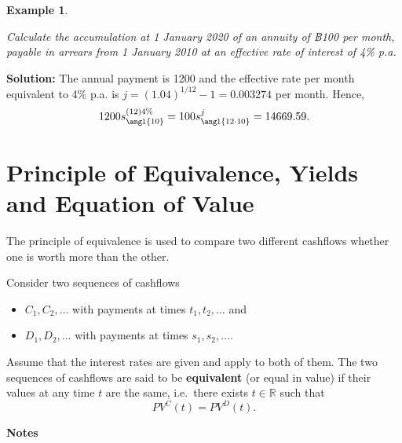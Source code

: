 \documentclass[landscape, 20pt]{extreport}
\theoremstyle{definition}
\theoremstyle{definition}
\newtheorem{example}{Example}[chapter]
\theoremstyle{definition}
\theoremstyle{definition}
\theoremstyle{remark}
\begin{document}
\newpage \begin{example}
\protect\hypertarget{exm:unlabeled-div-37}{}\label{exm:unlabeled-div-37}

\emph{Calculate the accumulation at 1 January 2020 of an annuity of ฿100 per
month, payable in arrears from 1 January 2010 at an effective rate of
interest of 4\% p.a.}

\end{example}

\textbf{Solution:} The annual payment is 1200 and the effective rate per
month equivalent to 4\% p.a. is \(j = (1.04)^{1/12} - 1 = 0.003274\) per
month. Hence,
\[1200 s^{(12)4\%}_\angl{10}   = 100  s^j_\angl{12\cdot 10} = 14669.59.\]



\newpage \hypertarget{principle-of-equivalence-yields-and-equation-of-value}{%
\section{Principle of Equivalence, Yields and Equation of Value}\label{principle-of-equivalence-yields-and-equation-of-value}}

The principle of equivalence is used to compare two different cashflows
whether one is worth more than the other.

Consider two sequences of cashflows

\begin{itemize}
\item
  \(C_1, C_2, \ldots\) with payments at times \(t_1, t_2, \ldots\) and
\item
  \(D_1, D_2, \ldots\) with payments at times \(s_1, s_2, \ldots\).
\end{itemize}

Assume that the interest rates are given and apply to both of them. The
two sequences of cashflows are said to be \textbf{equivalent} (or equal in
value) if their values at any time \(t\) are the same, i.e.~there exists
\(t \in \mathbb{R}\) such that \[PV^C(t)  = PV^D(t).\]

\textbf{Notes}
\end{document}
